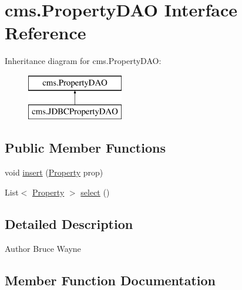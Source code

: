 \hypertarget{interfacecms_1_1_property_d_a_o}{}\section{cms.\+Property\+D\+AO Interface Reference}
\label{interfacecms_1_1_property_d_a_o}
Inheritance diagram for cms.\+Property\+D\+AO\+:\begin{figure}[H]
\begin{center}
\leavevmode
\includegraphics[height=2.000000cm]{interfacecms_1_1_property_d_a_o}
\end{center}
\end{figure}
\subsection*{Public Member Functions}
\begin{DoxyCompactItemize}
\item 
void \mbox{\hyperlink{interfacecms_1_1_property_d_a_o_a56361b7ac5be33a70e6d0651f9c42b27}{insert}} (\mbox{\hyperlink{classcms_1_1_property}{Property}} prop)
\item 
List$<$ \mbox{\hyperlink{classcms_1_1_property}{Property}} $>$ \mbox{\hyperlink{interfacecms_1_1_property_d_a_o_ad2087f5bf664d57bd7e75c09280b1fe5}{select}} ()
\end{DoxyCompactItemize}


\subsection{Detailed Description}
\begin{DoxyAuthor}{Author}
Bruce Wayne 
\end{DoxyAuthor}


\subsection{Member Function Documentation}
\mbox{\label{interfacecms_1_1_property_d_a_o_a56361b7ac5be33a70e6d0651f9c42b27}} 
